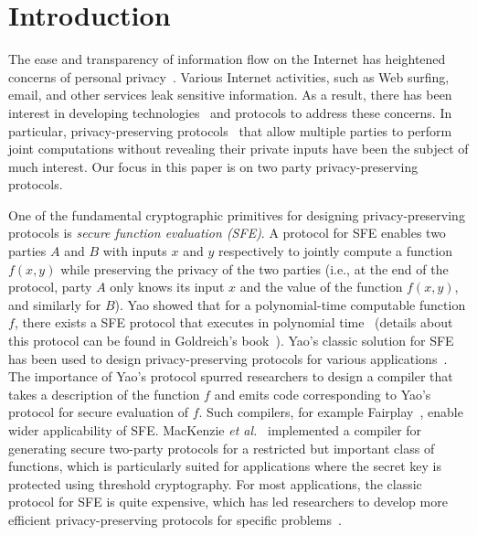 \section{Introduction}
\label{sec:intro}


The ease and transparency of information flow on the Internet has
heightened concerns of personal privacy~\cite{cra99,tur03}.  Various
Internet activities, such as Web surfing, email, and other
services leak sensitive information. As a result, there has been
interest in developing technologies~\cite{p3p02,gwb97,rks+97} and
protocols to address these concerns. In particular,
privacy-preserving protocols~\cite{FPRS04,FNP04,LP02,NPS99} that allow
multiple parties to perform joint computations without revealing their
private inputs have been the subject of much interest.
Our focus in this paper is on two party privacy-preserving protocols.



One of the fundamental cryptographic primitives for designing
privacy-preserving protocols is {\it secure function evaluation
(SFE)}. A protocol for SFE enables two parties $A$ and $B$ with inputs
$x$ and $y$ respectively to jointly compute a function $f(x,y)$ while
preserving the privacy of the two parties (i.e., at the end of the
protocol, party $A$ only knows its input $x$ and the value of the
function $f(x,y)$, and similarly for $B$).  
Yao showed that for a polynomial-time computable function $f$, there
exists a SFE protocol that executes in polynomial
time~\cite{GMW87,Yao:86} (details about this protocol can be found in
Goldreich's book~\cite[Chapter 7]{Goldreich:vol2}). Yao's classic
solution for SFE has been used to design privacy-preserving protocols
for various applications~\cite{AMP04}.  The importance of Yao's
protocol spurred researchers to design a compiler that takes a
description of the function $f$ and emits code corresponding to Yao's
protocol for secure evaluation of $f$. Such compilers, for example
Fairplay~\cite{Fairplay}, enable wider applicability of SFE.
MacKenzie {\it et al.}~\cite{Reiter:CCS:2003} implemented a compiler for
generating secure two-party protocols for a restricted but important
class of functions, which is particularly suited for applications
where the secret key is protected using threshold
cryptography. For most applications, the classic protocol for SFE is
quite expensive, which has led researchers to develop more efficient
privacy-preserving protocols for specific
problems~\cite{FPRS04,FNP04,LP02,NPS99}.


